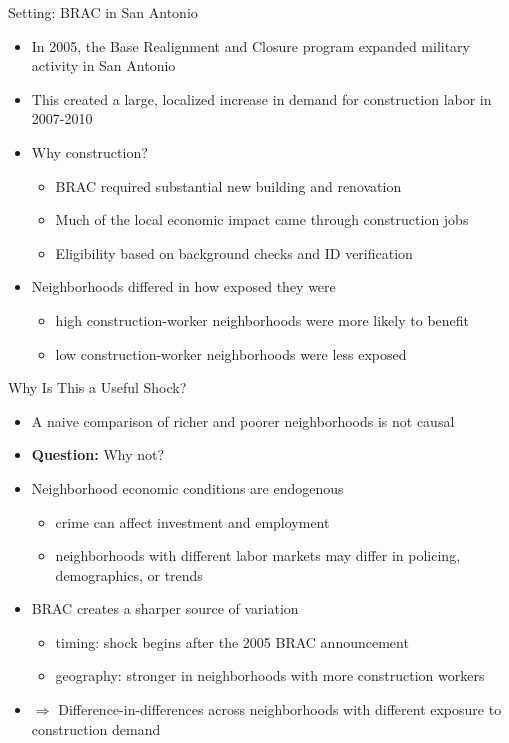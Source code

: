 \documentclass[11pt,notes=hide,aspectratio=169,mathserif]{beamer}
\begin{document}
\begin{frame}{Setting: BRAC in San Antonio}
\begin{itemize}
\item In 2005, the Base Realignment and Closure program expanded military activity in San Antonio
\pause \item This created a large, localized increase in demand for construction labor in 2007-2010
\pause \item Why construction?
\begin{itemize}
\item BRAC required substantial new building and renovation
\item Much of the local economic impact came through construction jobs
\item Eligibility based on background checks and ID verification
\end{itemize}
\pause \item Neighborhoods differed in how exposed they were
\begin{itemize}
\item high construction-worker neighborhoods were more likely to benefit
\item low construction-worker neighborhoods were less exposed
\end{itemize}
\end{itemize}
\end{frame}

\begin{frame}{Why Is This a Useful Shock?}
\begin{itemize}
\item A naive comparison of richer and poorer neighborhoods is not causal
\pause \item \textbf{Question:} Why not?
\pause \item Neighborhood economic conditions are endogenous
\begin{itemize}
\item crime can affect investment and employment
\item neighborhoods with different labor markets may differ in policing, demographics, or trends
\end{itemize}
\pause \item BRAC creates a sharper source of variation
\begin{itemize}
\item timing: shock begins after the 2005 BRAC announcement
\item geography: stronger in neighborhoods with more construction workers
\end{itemize}
\pause \item $\Rightarrow$ Difference-in-differences across neighborhoods with different exposure to construction demand
\end{itemize}
\end{frame}
\end{document}
